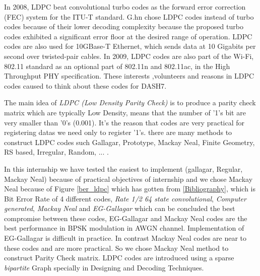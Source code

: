 In 2008, LDPC beat convolutional turbo codes as the forward error correction (FEC) system for the ITU-T standard.
G.hn chose LDPC codes instead of turbo codes because of their lower decoding complexity because the proposed turbo codes exhibited a significant error floor at the desired range of operation. LDPC codes are also used for 10GBase-T Ethernet, which sends data at 10 Gigabits per second over twisted-pair cables. In 2009, LDPC codes are also part of the Wi-Fi, 802.11 standard as an optional part of 802.11n and 802.11ac, in the High Throughput PHY specification.
These interests ,volunteers and reasons in LDPC codes caused to think about these codes for DASH7.

The main idea of \textit{LDPC (Low Density Parity Check)} is to produce a parity check matrix which are typically Low Density, means that the number of '1's bit are very smaller than '0's (0.001). It's the reason that codes are very practical for registering datas we need only to register '1's. there are many methods to construct LDPC codes such Gallagar, Prototype, Mackay Neal, Finite Geometry, RS based, Irregular, Random, ... .

In this internship we have tested the easiest to implement (gallagar, Regular, Mackay  Neal) because of practical objectives of internship and we chose Mackay Neal because of Figure \ref{ber_ldpc} which has gotten from \ref{Bibliography}, which is Bit Error Rate of 4 different codes, \textit{Rate 1/2 64 state convolutional}, \textit{Computer generated}, \textit{Mackay Neal} and \textit{EG-Gallagar} which can be concluded the best compromise between these codes, EG-Gallagar and Mackay Neal codes are the best performance in BPSK modulation in AWGN channel. Implementation of EG-Gallagar is difficult in practice. In contrast Mackay Neal codes are near to these codes and are more practical. So we chose Mackay Neal method to construct Parity Check matrix. LDPC codes are introduced using a sparse \textit{bipartite} Graph specially in Designing and Decoding Techniques\citep{errorcontrolcoding}.
    

